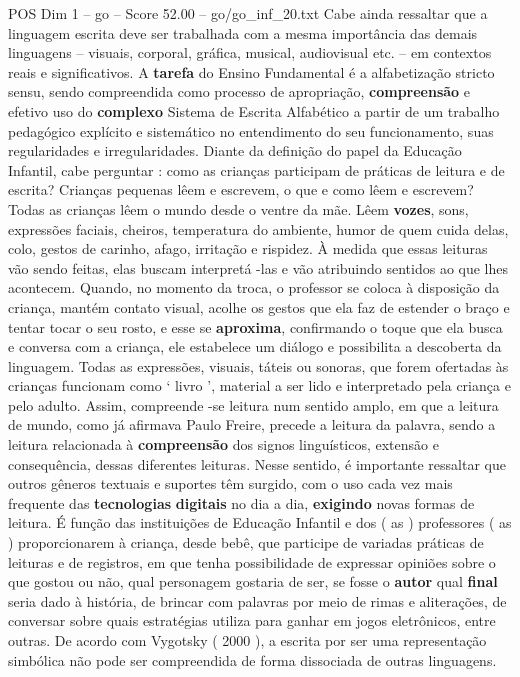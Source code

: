 \begin{textsample}{POS Dim 1 – go – Score 52.00 – go/go\_inf\_20.txt}
Cabe ainda ressaltar que a linguagem escrita deve ser trabalhada com a mesma importância das demais linguagens – visuais, corporal, gráfica, musical, audiovisual etc. – em contextos reais e significativos.
A \textbf{tarefa} do Ensino Fundamental é a alfabetização stricto sensu, sendo compreendida como processo de apropriação, \textbf{compreensão} e efetivo uso do \textbf{complexo} Sistema de Escrita Alfabético a partir de um trabalho pedagógico explícito e sistemático no entendimento do seu funcionamento, suas regularidades e irregularidades.
Diante da definição do papel da Educação Infantil, cabe perguntar : como as crianças participam de práticas de leitura e de escrita?
Crianças pequenas lêem e escrevem, o que e como lêem e escrevem?
Todas as crianças lêem o mundo desde o ventre da mãe.
Lêem \textbf{vozes}, sons, expressões faciais, cheiros, temperatura do ambiente, humor de quem cuida delas, colo, gestos de carinho, afago, irritação e rispidez.
À medida que essas leituras vão sendo feitas, elas buscam interpretá -las e vão atribuindo sentidos ao que lhes acontecem.
Quando, no momento da troca, o professor se coloca à disposição da criança, mantém contato visual, acolhe os gestos que ela faz de estender o braço e tentar tocar o seu rosto, e esse se \textbf{aproxima}, confirmando o toque que ela busca e conversa com a criança, ele estabelece um diálogo e possibilita a descoberta da linguagem.
Todas as expressões, visuais, táteis ou sonoras, que forem ofertadas às crianças funcionam como ‘ livro ’, material a ser lido e interpretado pela criança e pelo adulto.
Assim, compreende -se leitura num sentido amplo, em que a leitura de mundo, como já afirmava Paulo Freire, precede a leitura da palavra, sendo a leitura relacionada à \textbf{compreensão} dos signos linguísticos, extensão e consequência, dessas diferentes leituras.
Nesse sentido, é importante ressaltar que outros gêneros textuais e suportes têm surgido, com o uso cada vez mais frequente das \textbf{tecnologias} \textbf{digitais} no dia a dia, \textbf{exigindo} novas formas de leitura.
É função das instituições de Educação Infantil e dos ( as ) professores ( as ) proporcionarem à criança, desde bebê, que participe de variadas práticas de leituras e de registros, em que tenha possibilidade de expressar opiniões sobre o que gostou ou não, qual personagem gostaria de ser, se fosse o \textbf{autor} qual \textbf{final} seria dado à história, de brincar com palavras por meio de rimas e aliterações, de conversar sobre quais estratégias utiliza para ganhar em jogos eletrônicos, entre outras.
De acordo com Vygotsky ( 2000 ), a escrita por ser uma representação simbólica não pode ser compreendida de forma dissociada de outras linguagens.

\end{textsample}
